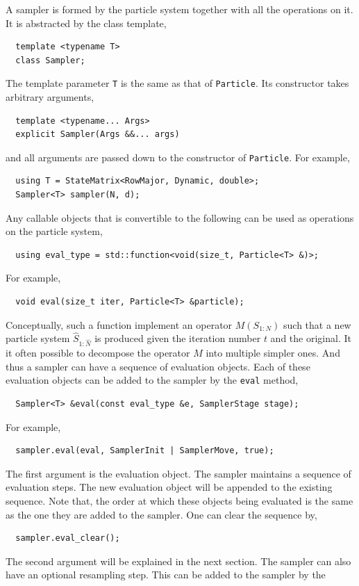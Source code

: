 A sampler is formed by the particle system together with all the operations on
it. It is abstracted by the class template,
\begin{Verbatim}
  template <typename T>
  class Sampler;
\end{Verbatim}
The template parameter \verb|T| is the same as that of \verb|Particle|. Its
constructor takes arbitrary arguments,
\begin{Verbatim}
  template <typename... Args>
  explicit Sampler(Args &&... args)
\end{Verbatim}
and all arguments are passed down to the constructor of \verb|Particle|. For
example,
\begin{Verbatim}
  using T = StateMatrix<RowMajor, Dynamic, double>;
  Sampler<T> sampler(N, d);
\end{Verbatim}
Any callable objects that is convertible to the following can be used as
operations on the particle system,
\begin{Verbatim}
  using eval_type = std::function<void(size_t, Particle<T> &)>;
\end{Verbatim}
For example,
\begin{Verbatim}
  void eval(size_t iter, Particle<T> &particle);
\end{Verbatim}
Conceptually, such a function implement an operator $M(S_{1:N})$ such that a
new particle system $\hat{S}_{1:\hat{N}}$ is produced given the iteration
number $t$ and the original. It it often possible to decompose the operator $M$
into multiple simpler ones. And thus a sampler can have a sequence of
evaluation objects. Each of these evaluation objects can be added to the
sampler by the \verb|eval| method,
\begin{Verbatim}
  Sampler<T> &eval(const eval_type &e, SamplerStage stage);
\end{Verbatim}
For example,
\begin{Verbatim}
  sampler.eval(eval, SamplerInit | SamplerMove, true);
\end{Verbatim}
The first argument is the evaluation object. The sampler maintains a sequence
of evaluation steps. The new evaluation object will be appended to the existing
sequence. Note that, the order at which these objects being evaluated is the
same as the one they are added to the sampler. One can clear the sequence by,
\begin{Verbatim}
  sampler.eval_clear();
\end{Verbatim}
The second argument will be explained in the next section. The sampler can also
have an optional resampling step. This can be added to the sampler by the
